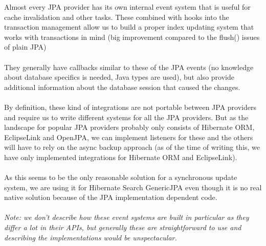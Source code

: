 Almost every JPA provider has its own internal event system that is useful for cache invalidation and other tasks. These combined with hooks into the transaction management allow us to build a proper index updating system that works with transactions in mind (big improvement compared to the flush() issues of plain JPA)
\\\\
They generally have callbacks similar to these of the JPA events (no knowledge about database specifics is needed, Java types are used), but also provide additional information about the database session that caused the changes.
\\\\
By definition, these kind of integrations are not portable between JPA providers and require us to write different systems for all the JPA providers. But as the landscape for popular JPA providers probably only consists of Hibernate ORM, EclipseLink and OpenJPA, we can implement listeners for these and the others will have to rely on the async backup approach (as of the time of writing this, we have only implemented integrations for Hibernate ORM and EclipseLink).
\\\\
As this seems to be the only reasonable solution for a synchronous update system, we are using it for Hibernate Search GenericJPA even though it is no real native solution because of the JPA implementation dependent code.
\\\\
\textit{Note: we don't describe how these event systems are built in particular as they differ a lot in their APIs, but generally these are straightforward to use and describing the implementations would be unspectacular.}

\pagebreak

